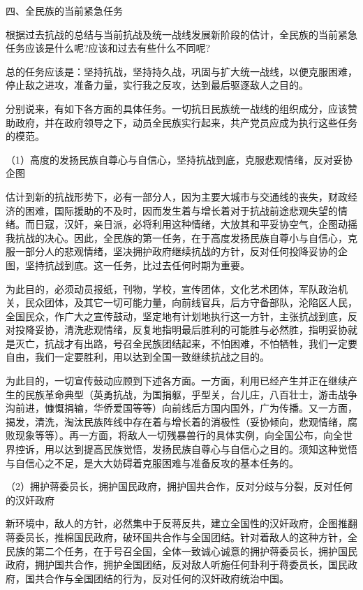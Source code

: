 \documentclass[UTF8, 12pt, a4paper]{ctexrep}
\begin{document}
四、全民族的当前紧急任务

根据过去抗战的总结与当前抗战及统一战线发展新阶段的估计，全民族的当前紧急任务应该是什么呢?应该和过去有些什么不同呢?

总的任务应该是：坚持抗战，坚持持久战，巩固与扩大统一战线，以便克服困难，停止敌之进攻，准备力量，实行我之反攻，达到最后驱逐敌人之目的。

分别说来，有如下各方面的具体任务。一切抗日民族统一战线的组织成分，应该赞助政府，并在政府领导之下，动员全民族实行起来，共产党员应成为执行这些任务的模范。

（1）高度的发扬民族自尊心与自信心，坚持抗战到底，克服悲观情绪，反对妥协企图

估计到新的抗战形势下，必有一部分人，因为主要大城市与交通线的丧失，财政经济的困难，国际援助的不及时，因而发生着与增长着对于抗战前途悲观失望的情绪。而日寇，汉奸，亲日派，必将利用这种情绪，大放其和平妥协空气，企图动摇我抗战的决心。因此，全民族的第一任务，在于高度发扬民族自尊小与自信心，克服一部分人的悲观情绪，坚决拥护政府继续抗战的方针，反对任何投降妥协的企图，坚持抗战到底。这一任务，比过去任何时期为重要。

为此目的，必须动员报纸，刊物，学校，宣传团体，文化艺术团体，军队政治机关，民众团体，及其它一切可能力量，向前线官兵，后方守备部队，沦陷区人民，全国民众，作广大之宣传鼓动，坚定地有计划地执行这一方针，主张抗战到底，反对投降妥协，清洗悲观情绪，反复地指明最后胜利的可能胜与必然胜，指明妥协就是灭亡，抗战才有出路，号召全民族团结起来，不怕困难，不怕牺牲，我们一定要自由，我们一定要胜利，用以达到全国一致继续抗战之目的。

为此目的，一切宣传鼓动应顾到下述各方面。一方面，利用已经产生并正在继续产生的民族革命典型（英勇抗战，为国捐躯，乎型关，台儿庄，八百壮士，游击战争沟前进，慷慨捐输，华侨爱国等等）向前线后方国内国外，广为传播。又一方面，揭发，清洗，淘汰民族阵线中存在着与增长着的消极性（妥协倾向，悲观情绪，腐败现象等等）。再一方面，将敌人一切残暴兽行的具体实例，向全国公布，向全世界控诉，用以达到提高民族觉悟，发扬民族自尊心与自信心之目的。须知这种觉悟与自信心之不足，是大大妨碍着克服困难与准备反攻的基本任务的。

（2）拥护蒋委员长，拥护国民政府，拥护国共合作，反对分歧与分裂，反对任何的汉奸政府

新环境中，敌人的方针，必然集中于反蒋反共，建立全国性的汉奸政府，企图推翻蒋委员长，推棉国民政府，破环国共合作与全国团结。针对着敌人的这种方针，全民族的第二个任务，在于号召全国，全体一致诚心诚意的拥护蒋委员长，拥护国民政府，拥护国共合作，拥护全国团结，反对敌人听施任何卦利于蒋委员长，国民政府，国共合作与全国团结的行为，反对任何的汉奸政府统治中国。
\end{document}
